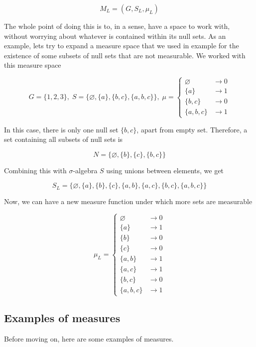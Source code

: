 \documentclass{article}
\begin{document}
\[ M_{L}=(G,S_{L},\mu_{L}) \]

The whole point of doing this is to, in a sense, have a space to work with, without worrying about whatever is contained within its null sets. As an example, lets try to expand a measure space that we used in example for the existence of some subsets of null sets that are not measurable. We worked with this measure space

\[ G=\{1,2,3\},\;S=\{\varnothing, \{a\},\{b,c\},\{a,b,c\}\},\; \mu=\begin{cases}
    \varnothing & \to 0 \\
    \{a\} & \to 1 \\
    \{b,c\} & \to 0 \\
    \{a,b,c\} & \to 1
\end{cases} \]

In this case, there is only one null set $\{b,c\}$, apart from empty set. Therefore, a set containing all subsets of null sets is

\[N=\{\varnothing, \{b\}, \{c\}, \{b,c\}\}\]

Combining this with $\sigma$-algebra $S$ using unions between elements, we get

\[ S_{L}=\{\varnothing,\{a\},\{b\},\{c\},\{a,b\},\{a,c\},\{b,c\},\{a,b,c\}\} \]

Now, we can have a new measure function under which more sets are measurable

\[ \mu_{L}=\begin{cases}
    \varnothing & \to 0 \\
    \{a\} & \to 1 \\
    \{b\} & \to 0 \\
    \{c\} & \to 0 \\
    \{a,b\} & \to 1 \\
    \{a,c\} & \to 1 \\
    \{b,c\} & \to 0 \\
    \{a,b,c\} & \to 1
\end{cases} \]

\subsection{Examples of measures}

Before moving on, here are some examples of measures.
\end{document}
